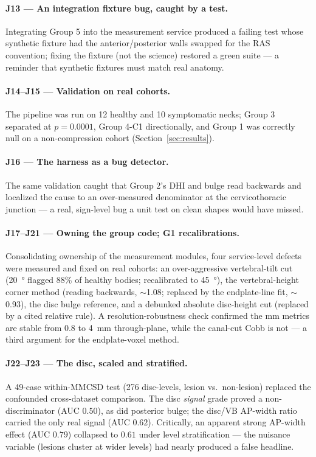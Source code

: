 \paragraph{J13 --- An integration fixture bug, caught by a test.} Integrating Group 5 into the
measurement service produced a failing test whose synthetic fixture had the anterior/posterior walls
swapped for the RAS convention; fixing the fixture (not the science) restored a green suite --- a reminder
that synthetic fixtures must match real anatomy.

\paragraph{J14--J15 --- Validation on real cohorts.} The pipeline was run on 12 healthy and 10
symptomatic necks; Group 3 separated at $p=0.0001$, Group 4-C1 directionally, and Group 1 was correctly
null on a non-compression cohort (Section~\ref{sec:results}).

\paragraph{J16 --- The harness as a bug detector.} The same validation caught that Group 2's DHI and bulge
read backwards and localized the cause to an over-measured denominator at the cervicothoracic junction ---
a real, sign-level bug a unit test on clean shapes would have missed.

\paragraph{J17--J21 --- Owning the group code; G1 recalibrations.} Consolidating ownership of the
measurement modules, four service-level defects were measured and fixed on real cohorts: an over-aggressive
vertebral-tilt cut (\SI{20}{\degree} flagged 88\% of healthy bodies; recalibrated to \SI{45}{\degree}), the
vertebral-height corner method (reading \hahp{} backwards, \(\sim\)1.08; replaced by the endplate-line
fit, \(\sim\)0.93), the disc bulge reference, and a debunked absolute disc-height cut (replaced by a cited
relative rule). A resolution-robustness check confirmed the mm metrics are stable from \SI{0.8}{} to
\SI{4}{\milli\meter} through-plane, while the canal-cut Cobb is not --- a third argument for the
endplate-voxel method.

\paragraph{J22--J23 --- The disc, scaled and stratified.} A 49-case within-MMCSD test (276 disc-levels,
lesion vs.\ non-lesion) replaced the confounded cross-dataset comparison. The disc \emph{signal} grade
proved a non-discriminator (AUC $0.50$), as did posterior bulge; the disc/VB AP-width ratio carried the
only real signal (AUC $0.62$). Critically, an apparent strong AP-width effect (AUC $0.79$) collapsed to
$0.61$ under level stratification --- the nuisance variable (lesions cluster at wider levels) had nearly
produced a false headline.

